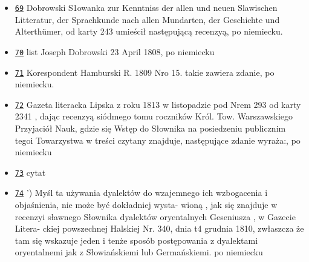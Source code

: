 \documentclass[12]{mwart}
\begin{document}
\begin{itemize}
\begin{itemize}
     \item \href{\pavia{6-1}{71}}{\texttt{69}} Dobrowski S1owanka zur
       Kenntniss der allen und neuen Slawischen Litteratur, der
       Sprachkunde nach allen Mundarten, der Geschichte und
       Alterthümer, od karty 243 umieścił następującą recenzyą, po niemiecku.
     \item \href{\pavia{6-1}{72}}{\texttt{70}} list Joseph Dobrowski 23 April 1808, po niemiecku
     \item \href{\pavia{6-1}{73}}{\texttt{71}} Korespondent Hamburski
       R. 1809 Nro 15. takie zawiera zdanie, po niemiecku.
     \item \href{\pavia{6-1}{74}}{\texttt{72}} Gazeta literacka Lipska
       z roku 1813 w listopadzie pod Nrem 293 od karty 2341 , dając
       recenzyą siódmego tomu roczników Król. Tow. Warszawskiego
       Przyjaciół Nauk, gdzie się Wstęp do Słownika na posiedzeniu
       publicznim tegoi Towarzystwa w treści czytany znajduje,
       następujące zdanie wyraża:, po niemiecku
\item \href{\pavia{6-1}{75}}{\texttt{73}} cytat
     \item \href{\pavia{6-1}{76}}{\texttt{74}} ') Myśl ta używania
       dyalektów do wzajemnego ich wzbogacenia i objaśnienia, nie może
       być dokładniej wysta- wioną , jak się znajduje w recenzyi
       sławnego Słownika dyalektów oryentalnych Geseniusza , w Gazecie
       Litera- ckiej powszechnej Halskiej Nr. 340, dnia t4 grudnia
       1810, zwłaszcza że tam się wskazuje jeden i tenże sposób
       postępowania z dyalektami oryentalnemi jak z Słowiańskiemi lub
       Germańskiemi. po niemiecku
  \end{itemize}
\end{itemize}

\printbibliography
\end{document}
